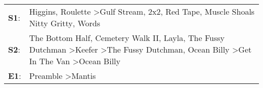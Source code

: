 \begin{supertabular}{p{0.03\textwidth}p{0.92\textwidth}}
 \textbf{S1}:  &                                                                                                                                              Higgins\textsuperscript{}, \enspace Roulette\textsuperscript{} \textgreater \enspace Gulf Stream\textsuperscript{}, \enspace 2x2\textsuperscript{}, \enspace Red Tape\textsuperscript{}, \enspace Muscle Shoals Nitty Gritty\textsuperscript{}, \enspace Words\textsuperscript{}  \enspace  \\
 \textbf{S2}:  &  The Bottom Half\textsuperscript{}, \enspace Cemetery Walk II\textsuperscript{}, \enspace Layla\textsuperscript{}, \enspace The Fussy Dutchman\textsuperscript{} \textgreater \enspace Keefer\textsuperscript{} \textgreater \enspace The Fussy Dutchman\textsuperscript{}, \enspace Ocean Billy\textsuperscript{} \textgreater \enspace Get In The Van\textsuperscript{} \textgreater \enspace Ocean Billy\textsuperscript{}  \enspace  \\
 \textbf{E1}:  &                                                                                                                                                                                                                                                                                                                                                     Preamble\textsuperscript{} \textgreater \enspace Mantis\textsuperscript{}  \enspace  \\
\end{supertabular}
